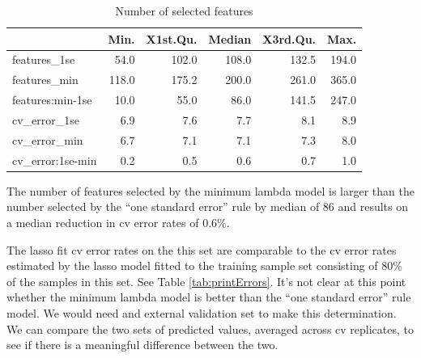 \documentclass[
]{book}
\begin{document}
\begin{table}

\caption{\label{tab:model-size-lassoAll}Number of selected features}
\centering
\begin{tabular}[t]{l|r|r|r|r|r}
\hline
  & Min. & X1st.Qu. & Median & X3rd.Qu. & Max.\\
\hline
features\_1se & 54.0 & 102.0 & 108.0 & 132.5 & 194.0\\
\hline
features\_min & 118.0 & 175.2 & 200.0 & 261.0 & 365.0\\
\hline
features:min-1se & 10.0 & 55.0 & 86.0 & 141.5 & 247.0\\
\hline
cv\_error\_1se & 6.9 & 7.6 & 7.7 & 8.1 & 8.9\\
\hline
cv\_error\_min & 6.7 & 7.1 & 7.1 & 7.3 & 8.0\\
\hline
cv\_error:1se-min & 0.2 & 0.5 & 0.6 & 0.7 & 1.0\\
\hline
\end{tabular}
\end{table}

The number of features selected by the minimum lambda model is larger
than the number selected by the ``one standard error'' rule by median
of \(86\) and results on
a median reduction in cv error rates of
\(0.6\)\%.

The lasso fit cv error rates on the this set are comparable to the
cv error rates estimated by the lasso model fitted to the training sample set
consisting of 80\% of the samples in this set. See Table \ref{tab:printErrors}.
It's not clear at this point whether the minimum lambda model is better than
the ``one standard error'' rule model. We would need and external validation
set to make this determination. We can compare the two sets
of predicted values, averaged across cv replicates, to see if
there is a meaningful difference between the two.
\end{document}

